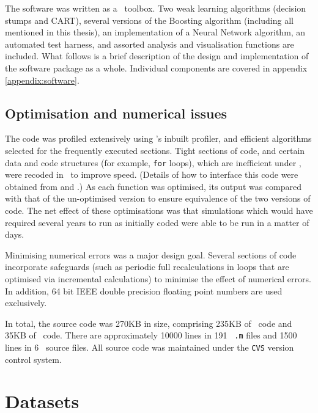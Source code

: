The software was written as a \MATLAB\ toolbox.  Two weak learning
algorithms (decision stumps and CART), several versions of the
Boosting algorithm (including all mentioned in this thesis), an
implementation of a Neural Network algorithm, an automated test
harness, and assorted analysis and visualisation functions are
included.  What follows is a brief description of the design and
implementation of the software package as a whole.  Individual
components are covered in appendix \ref{appendix:software}.

\subsection{Optimisation and numerical issues}

The code was profiled extensively using \MATLAB's inbuilt profiler,
and efficient algorithms selected for the frequently executed
sections.  Tight sections of code, and certain data and code
structures (for example, {\tt for} loops), which are inefficient under
\MATLAB, were recoded in \C\ to improve speed.  (Details of how
to interface this code were obtained from \cite{MathWorks96} and
\cite{MathWorks96a}.) As each function was optimised, its output was
compared with that of the un-optimised version to ensure equivalence
of the two versions of code.  The net effect of these optimisations
was that simulations which would have required several years to run as
initially coded were able to be run in a matter of days.

Minimising numerical errors was a major design goal.  Several sections
of code incorporate safeguards (such as periodic full recalculations
in loops that are optimised via incremental calculations) to minimise the
effect of numerical errors.  In addition, 64 bit IEEE double precision
floating point numbers are used exclusively.

In total, the source code was 270KB in size, comprising 235KB of
\MATLAB\ code and 35KB of \C\ code.  There are approximately 10000
lines in 191 \MATLAB\ {\tt .m} files and 1500 lines in 6 \C\ source
files.  All source code was maintained under the {\tt CVS} version
control system.

\section{Datasets}


